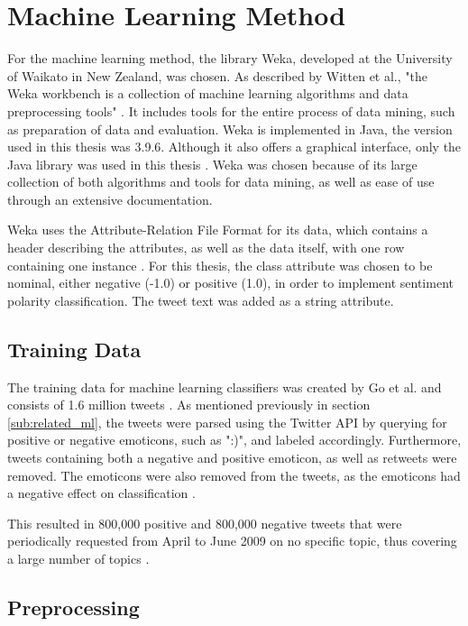 \section{Machine Learning Method}

For the machine learning method, the library Weka, developed at the University of Waikato in New Zealand, was chosen. As described by Witten et al., "the Weka workbench is a collection of machine learning algorithms and data preprocessing tools" \cite[p.~7]{Weka}. It includes tools for the entire process of data mining, such as preparation of data and evaluation. Weka is implemented in Java, the version used in this thesis was 3.9.6. Although it also offers a graphical interface, only the Java library was used in this thesis \cite{Weka}. Weka was chosen because of its large collection of both algorithms and tools for data mining, as well as ease of use through an extensive documentation.

Weka uses the Attribute-Relation File Format for its data, which contains a header describing the attributes, as well as the data itself, with one row containing one instance \cite{Weka}. For this thesis, the class attribute was chosen to be nominal, either negative (-1.0) or positive (1.0), in order to implement sentiment polarity classification. The tweet text was added as a string attribute.

\subsection{Training Data}
The training data for machine learning classifiers was created by Go et al. and consists of 1.6 million tweets \cite{GoBHaHua2009}. As mentioned previously in section \ref{sub:related_ml}, the tweets were parsed using the Twitter API by querying for positive or negative emoticons, such as ":)", and labeled accordingly. Furthermore, tweets containing both a negative and positive emoticon, as well as retweets were removed. The emoticons were also removed from the tweets, as the emoticons had a negative effect on classification \cite{GoBHaHua2009}.

This resulted in 800,000 positive and 800,000 negative tweets that were periodically requested from April to June 2009 on no specific topic, thus covering a large number of topics \cite{GoBHaHua2009}.

\subsection{Preprocessing}

